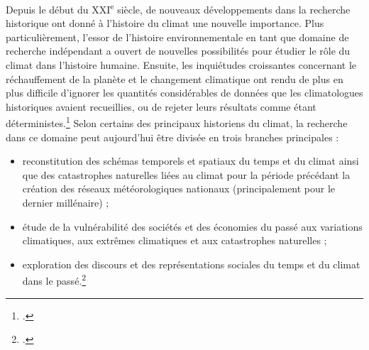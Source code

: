 \documentclass[a4paper,twoside,12pt]{article}
\begin{document}
Depuis le début du XXI\textsuperscript{e} siècle, de nouveaux développements dans la recherche historique ont donné à l'histoire du climat une nouvelle importance. Plus particulièrement, l'essor de l'histoire environnementale en tant que domaine de recherche indépendant a ouvert de nouvelles possibilités pour étudier le rôle du climat dans l'histoire humaine. Ensuite, les inquiétudes croissantes concernant le réchauffement de la planète et le changement climatique ont rendu de plus en plus difficile d'ignorer les quantités considérables de données que les climatologues historiques avaient recueillies, ou de rejeter leurs résultats comme étant déterministes.\footcite[10]{white_palgrave_2018} Selon certains des principaux historiens du climat, la recherche dans ce domaine peut aujourd'hui être divisée en trois branches principales :

\vspace{1ex}
\begin{itemize}[label=$\bullet$]
    \item reconstitution des schémas temporels et spatiaux du temps et du climat ainsi que des catastrophes naturelles liées au climat pour la période précédant la création des réseaux météorologiques nationaux (principalement pour le dernier millénaire) ;
    \item étude de la vulnérabilité des sociétés et des économies du passé aux variations climatiques, aux extrêmes climatiques et aux catastrophes naturelles ;
    \item exploration des discours et des représentations sociales du temps et du climat dans le passé.\footcites[Initialement proposé par R. Brázdil \textit{et al.} :][365-366]{brazdil_historical_2005}[et référencé par C. Pfister \textit{et al.}][11]{white_palgrave_2018}[M. Carey y ajoute encore \og usages et abus de la connaissance du climat \fg{} :][]{carey_climate_2012}
\end{itemize}
\vspace{1ex}
\end{document}
